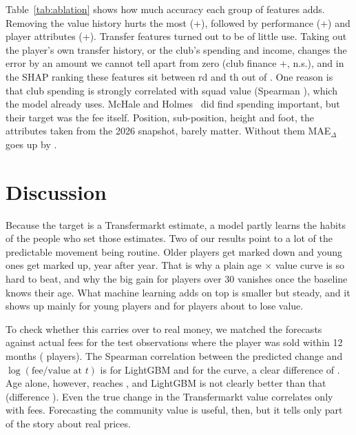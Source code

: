 \documentclass[conference]{IEEEtran}
\begin{document}
Table~\ref{tab:ablation} shows how much accuracy each group of features adds. Removing the value history hurts the most (+\AblHist), followed by performance (+\AblPerf) and player attributes (+\AblPlayer). Transfer features turned out to be of little use. Taking out the player's own transfer history, or the club's spending and income, changes the error by an amount we cannot tell apart from zero (club finance +\AblFin, n.s.), and in the SHAP ranking these features sit between \ShapFinRankMin{}rd and \ShapFinRankMax{}th out of \NFeatures. One reason is that club spending is strongly correlated with squad value (Spearman \SpendTotalValueCorr), which the model already uses. McHale and Holmes~\cite{mchale2023estimating} did find spending important, but their target was the fee itself. Position, sub-position, height and foot, the attributes taken from the 2026 snapshot, barely matter. Without them MAE$_\Delta$ goes up by \SnapDiff{} \SnapDiffCI.



\section{Discussion}
Because the target is a Transfermarkt estimate, a model partly learns the habits of the people who set those estimates. Two of our results point to a lot of the predictable movement being routine. Older players get marked down and young ones get marked up, year after year. That is why a plain age $\times$ value curve is so hard to beat, and why the big gain for players over 30 vanishes once the baseline knows their age. What machine learning adds on top is smaller but steady, and it shows up mainly for young players and for players about to lose value.

To check whether this carries over to real money, we matched the forecasts against actual fees for the \FeeN{} test observations where the player was sold within 12 months (\FeePlayers{} players). The Spearman correlation between the predicted change and $\log(\text{fee}/\text{value at }t)$ is \FeeRhoLGB{} \FeeRhoLGBCI{} for LightGBM and \FeeRhoCurve{} \FeeRhoCurveCI{} for the curve, a clear difference of \FeeRhoDiffCurve{} \FeeRhoDiffCurveCI. Age alone, however, reaches \FeeRhoAge{} \FeeRhoAgeCI, and LightGBM is not clearly better than that (difference \FeeRhoDiffAge{} \FeeRhoDiffAgeCI). Even the true change in the Transfermarkt value correlates only \FeeRhoTrue{} with fees. Forecasting the community value is useful, then, but it tells only part of the story about real prices.
\end{document}
